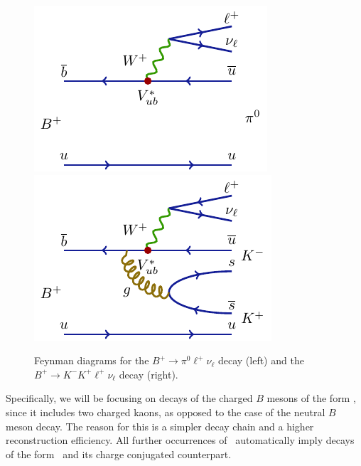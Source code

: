 \begin{figure}[!htb]
\centering
\includegraphics{texfig/B2pilnu}
\hspace{1cm}
\includegraphics{texfig/B2KKlnu}
\caption{Feynman diagrams for the $B^+ \to \pi^0 \ell^+ \nu_\ell$ decay (left) and the $B^+ \to K^- K^+ \ell^+ \nu_\ell$ decay (right).}
\label{feynman}
\end{figure}

Specifically, we will be focusing on decays of the charged $B$ mesons of the form \decayb, since it includes two charged kaons, as opposed to the case of the neutral $B$ meson decay. The reason for this is a simpler decay chain and a higher reconstruction efficiency. All further occurrences of \decaya~automatically imply decays of the form \decayb~and its charge conjugated counterpart.